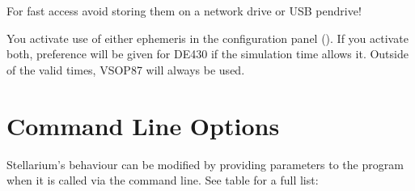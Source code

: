 For fast access avoid storing them on a network drive or USB pendrive!

You activate use of either ephemeris in the configuration panel
(). If you activate both, preference will be given for DE430
if the simulation time allows it. Outside of the valid times, VSOP87
will always be used.



\chapter{Command Line Options}
\label{command-line-options}
\label{sec:CommandLineOptions}

Stellarium's behaviour can be modified by providing parameters to the
program when it is called via the command line. See table for a full list:

